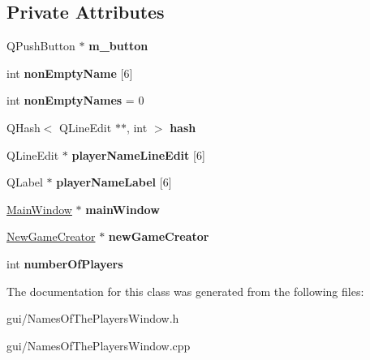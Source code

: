 \subsection*{Private Attributes}
\begin{DoxyCompactItemize}
\item 
\mbox{\label{classNamesOfThePlayersWindow_af3d05700a49bcf0a97c2ecb87e177d66}} 
Q\+Push\+Button $\ast$ {\bfseries m\+\_\+button}
\item 
\mbox{\label{classNamesOfThePlayersWindow_acda75ef383449937a440cb6c6aa8763d}} 
int {\bfseries non\+Empty\+Name} \mbox{[}6\mbox{]}
\item 
\mbox{\label{classNamesOfThePlayersWindow_a80513fdb9f1ae851006c97d50f76f7bd}} 
int {\bfseries non\+Empty\+Names} = 0
\item 
\mbox{\label{classNamesOfThePlayersWindow_ad4b577c21ff10dc19b59003304476485}} 
Q\+Hash$<$ Q\+Line\+Edit $\ast$$\ast$, int $>$ {\bfseries hash}
\item 
\mbox{\label{classNamesOfThePlayersWindow_aafcf7ee8997518cacafd0bfe5a672076}} 
Q\+Line\+Edit $\ast$ {\bfseries player\+Name\+Line\+Edit} \mbox{[}6\mbox{]}
\item 
\mbox{\label{classNamesOfThePlayersWindow_a51db06bcac725e579c9649f0b165275d}} 
Q\+Label $\ast$ {\bfseries player\+Name\+Label} \mbox{[}6\mbox{]}
\item 
\mbox{\label{classNamesOfThePlayersWindow_afa90e8363639494e94c71708c30418ce}} 
\hyperlink{classMainWindow}{Main\+Window} $\ast$ {\bfseries main\+Window}
\item 
\mbox{\label{classNamesOfThePlayersWindow_aedd593e9b51b58be2c7027d66d5a93c4}} 
\hyperlink{classNewGameCreator}{New\+Game\+Creator} $\ast$ {\bfseries new\+Game\+Creator}
\item 
\mbox{\label{classNamesOfThePlayersWindow_a463f4eaad5016a4cde933db51566914b}} 
int {\bfseries number\+Of\+Players}
\end{DoxyCompactItemize}


The documentation for this class was generated from the following files\+:\begin{DoxyCompactItemize}
\item 
gui/Names\+Of\+The\+Players\+Window.\+h\item 
gui/Names\+Of\+The\+Players\+Window.\+cpp\end{DoxyCompactItemize}
